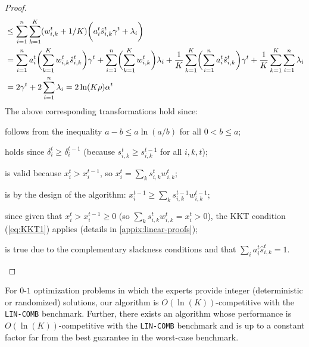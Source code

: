 \begin{proof}
\begin{align}
	&\leq \sum_{i=1}^{n} \sum_{k=1}^{K} (w_{i,k}^{t} + 1/K) \biggl( a_{i}^{t} \hat{s}_{i,k}^{t} \gamma^t + \lambda_{i} \biggr) \notag \\
	&= \sum_{i=1}^{n} a_{i}^{t} \biggl(\sum_{k=1}^{K} w_{i,k}^{t} \hat{s}_{i,k}^{t} \biggr) \gamma^t + \sum_{i=1}^{n} \biggl( \sum_{k=1}^{K} w_{i,k}^{t} \biggr) \lambda_{i}
	+ \frac{1}{K}  \sum_{k=1}^{K} \biggl( \sum_{i=1}^{n} a_{i}^{t}  \hat{s}_{i,k}^{t}  \biggr) \gamma^t + \frac{1}{K} \sum_{k=1}^{K} \sum_{i=1}^{n} \lambda_{i} 		\notag \\
	&= 2 \gamma^{t} + 2\sum_{i=1}^{n} \lambda_{i} = 2\ln(K \rho) \alpha^{t}
	\end{align}
	\clearpage
	\noindent The above corresponding transformations hold since:
	\begin{compactenum}[(1)]
		\setcounter{enumi}{1}
		\item follows from the inequality $a - b \leq a \ln(a/b)$ for all $0 < b \leq a$;
		\item holds since $\delta_{i}^{t} \geq \delta_{i}^{t-1}$ (because $s_{i,k}^{t} \geq s_{i,k}^{t-1}$ for all $i,k,t$);
		\item is valid because $x_{i}^{t} > x_{i}^{t-1}$, so $x_{i}^{t} = \sum_{k}  s_{i,k}^{t} w_{i,k}^{t}$;
		\item is by the design of the algorithm: $x_{i}^{t-1} \geq \sum_{k}  s_{i,k}^{t-1} w_{i,k}^{t-1}$;
		\setcounter{enumi}{5}
		\item since given that $x_{i}^{t} > x_{i}^{t-1} \geq 0$
		(so $\sum_{k}  s_{i,k}^{t} w_{i,k}^{t} = x_{i}^{t} > 0$), the KKT condition (\ref{eq:KKT1}) applies (details in \cref{appix:linear-proofs});
		\item is true due to the complementary slackness conditions
			and that $\sum_{i} a_{i}^{t}  \hat{s}_{i,k}^{t} = 1$.
	\end{compactenum}
\end{proof}
%
%
%
\begin{corollary} \label{corollary}
	For $0$-$1$ optimization problems in which the experts provide integer (deterministic or randomized) solutions,
	our algorithm is $O(\ln (K))$-competitive with the \texttt{LIN-COMB} benchmark.
	Further, there exists an algorithm whose performance is $O(\ln (K))$-competitive with the \texttt{LIN-COMB}
	benchmark and is up to a constant factor far from the best guarantee in the worst-case benchmark.
\end{corollary}
%
